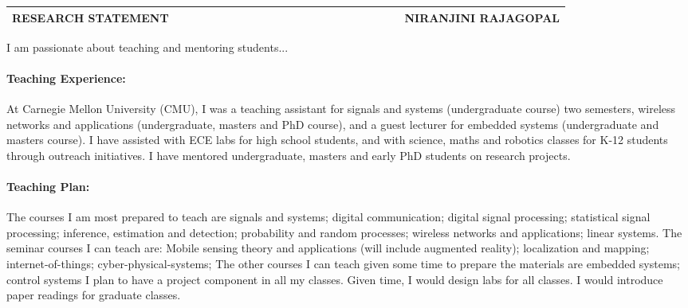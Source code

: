 \documentclass[10pt]{article}
\date{}
\begin{document}

\begin{table}
\color{blue}
\begin{tabular*}{\textwidth}{l r}
\large\textbf{RESEARCH STATEMENT} & 
\hfill \ \ \ \ \ \ \ \ \ \ \ \ \ \ \ \ \ \ \ \
\ \ \ \ \ \ \ \ \ \ \ \ \ \ \ 
\large\textbf{NIRANJINI RAJAGOPAL}\\
\hline
\end{tabular*}

\end{table}

I am passionate about teaching and mentoring students... %

\paragraph{Teaching Experience:}
At Carnegie Mellon University (CMU), I was a teaching assistant for signals and systems (undergraduate course) two semesters, wireless networks and applications (undergraduate, masters and PhD course), and a guest lecturer for embedded systems (undergraduate and masters course). I have assisted with ECE labs for high school students, and with science, maths and robotics classes for K-12 students through outreach initiatives. I have mentored undergraduate, masters and early PhD students on research projects.  

\paragraph{Teaching Plan:}
The courses I am most prepared to teach are signals and systems; digital communication; digital signal processing; statistical signal processing; inference, estimation and detection; probability and random processes; wireless networks and applications; linear systems. 
The seminar courses I can teach are: Mobile sensing theory and applications (will include augmented reality); localization and mapping; internet-of-things; cyber-physical-systems; %
The other courses I can teach given some time to prepare the materials are embedded systems; control systems%
I plan to have a project component in all my classes. Given time, I would design labs for all classes. I would introduce paper readings for graduate classes.
\end{document}
